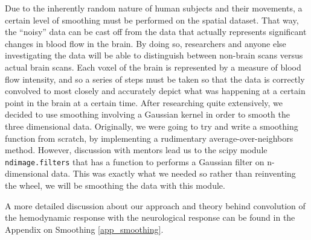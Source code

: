 \par \indent Due to the inherently random nature of human subjects and their 
movements, a certain level of smoothing must be performed on the spatial 
dataset. That way, the ``noisy'' data can be cast off from the data that 
actually represents significant changes in blood flow in the brain. By doing 
so, researchers and anyone else investigating the data will be able to 
distinguish between non-brain scans versus actual brain scans. Each voxel of 
the brain is represented by a measure of blood flow intensity, and so a 
series of steps must be taken so that the data is correctly convolved to most 
closely and accurately depict what was happening at a certain point in the 
brain at a certain time. After researching quite extensively, we decided to 
use smoothing involving a Gaussian kernel in order to smooth the three 
dimensional data. Originally, we were going to try and write a smoothing 
function from scratch, by implementing a rudimentary average-over-neighbors 
method. However, discussion with mentors lead us to the scipy module 
\texttt{ndimage.filters} that has a function to performs a Gaussian filter on 
n-dimensional data. This was exactly what we needed so rather than reinventing 
the wheel, we will be smoothing the data with this module. 

\par \indent A more detailed discussion about our approach and theory behind 
convolution of the hemodynamic response with the neurological response can be
found in the Appendix on Smoothing \ref{app_smoothing}.


